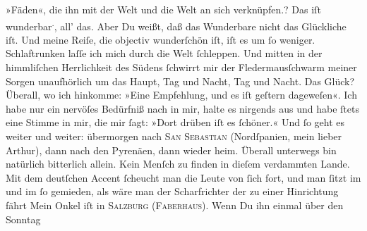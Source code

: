 \begin{ledgroupsized}[t]{13cm}
{{{                     »Fäden«, die ihn mit der Welt und die Welt an sich
                  verknüpfen.}}}\label{K_L02701-3h}?\pend
           \pstart
           Das iſt wunderbar\substVorne{}\textsuperscript{.}\substDazwischen{},\substHinten{} all’ das. Aber Du {\pb}weißt, daß das
               Wunderbare nicht das Glückliche iſt. Und meine Reiſe, die objectiv wunderſchön iſt,
               iſt es \label{T_L02701-1v}\label{T_L02701-1h} um ſo weniger. Schlaftrunken laſſe ich mich durch die Welt
               ſchleppen. Und mitten in\strikeout{\textcolor{gray}{s}} der himmliſchen Herrlichkeit des Südens ſchwirrt mir der Fledermausſchwarm
               meiner Sorgen unaufhörlich um das Haupt, Tag und Nacht, Tag und Nacht. Das Glück?
               Überall, wo ich hinkomme: »Eine Empfehlung, {\pb}und es
               iſt geſtern dageweſen«. Ich habe nur ein nervöſes Bedürfniß nach \label{K_L02701-4v}\label{K_L02701-4h} in mir, halte es
               nirgends aus und habe ſtets eine Stimme in mir, die mir ſagt: »Dort drüben iſt es
               ſchöner.« Und ſo geht es weiter und weiter: übermorgen
               nach \textsc{San Sebastian} (Nordſpanien, mein lieber Arthur), dann
               nach den Pyrenäen, dann wieder heim. Überall
               unterwegs bin natürlich {\pb}bitterlich allein. Kein
               Menſch zu finden in dieſem verdammten Lande. Mit dem deutſchen Accent ſcheucht man
               die Leute von ſich fort,  und man ſitzt im \label{K_L02701-5v}\label{K_L02701-5h} und im \label{T_L02701-2v}\label{T_L02701-2h} ſo
               gemieden, als wäre man der Scharfrichter der zu einer Hinrichtung fährt{\dotsfour}\pend
           \pstart
           Mein Onkel iſt in \textsc{Salzburg} (\textsc{Faberhaus}). {\pb}Wenn Du ihn einmal über den Sonntag

\end{ledgroupsized}
